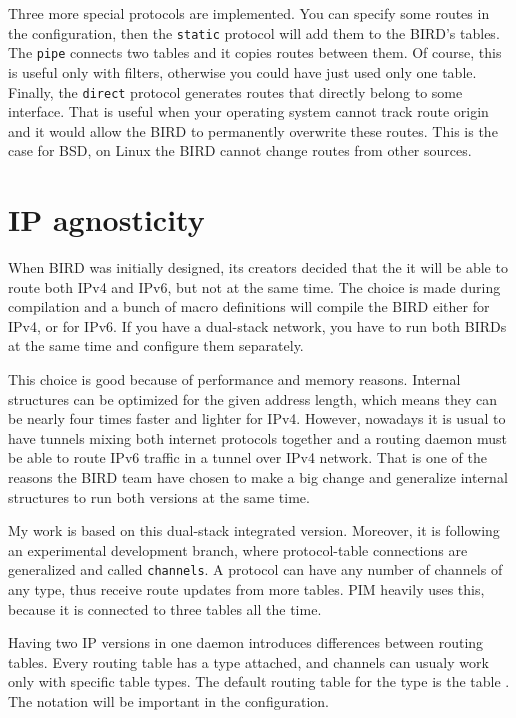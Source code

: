 Three more special protocols are implemented. You can specify some routes in
the configuration, then the \texttt{static} protocol will add them to the BIRD's
tables. The \texttt{pipe} connects two tables and it copies routes between
them. Of course, this is useful only with filters, otherwise you could have
just used only one table. Finally, the \texttt{direct} protocol generates routes
that directly belong to some interface. That is useful when your operating
system cannot track route origin and it would allow the BIRD to permanently
overwrite these routes. This is the case for BSD, on Linux the BIRD cannot
change routes from other sources.

\section{IP agnosticity}
When BIRD was initially designed, its creators decided that the it will be able to
route both IPv4 and IPv6, but not at the same time. The choice is made during
compilation and a bunch of macro definitions will compile the BIRD either for
IPv4, or for IPv6. If you have a dual-stack network, you have to run both BIRDs
at the same time and configure them separately.

This choice is good because of performance and memory reasons. Internal
structures can be optimized for the given address length, which means they can be
nearly four times faster and lighter for IPv4. However, nowadays it is usual to
have tunnels mixing both internet protocols together and a routing daemon must
be able to route IPv6 traffic in a tunnel over IPv4 network. That is one of the
reasons the BIRD team have chosen to make a big change and generalize internal
structures to run both versions at the same time.

My work is based on this dual-stack integrated version. Moreover, it is
following an experimental development branch, where protocol-table connections
are generalized and called \texttt{channels}. A protocol can have any number of
channels of any type, thus receive route updates from more tables. PIM heavily
uses this, because it is connected to three tables all the time.

Having two IP versions in one daemon introduces differences between routing
tables. Every routing table has a type attached, and channels can usualy work
only with specific table types. The default routing table for the type
 is the table . The notation will be important in the
configuration.

